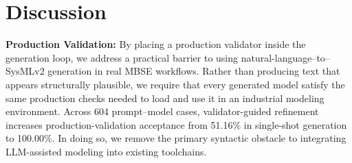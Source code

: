 \documentclass[colorlinks,upint,subscriptcorrection,varvw,hyphenate,balance]{asmeconf} %
\begin{document}








\section{Discussion}

\textbf{Production Validation:} By placing a production validator inside the generation loop, we address a practical barrier to using natural-language--to--SysMLv2 generation in real MBSE workflows. Rather than producing text that appears structurally plausible, we require that every generated model satisfy the same production checks needed to load and use it in an industrial modeling environment. Across 604 prompt--model cases, validator-guided refinement increases production-validation acceptance from 51.16\% in single-shot generation to 100.00\%. In doing so, we remove the primary syntactic obstacle to integrating LLM-assisted modeling into existing toolchains.
\end{document}
